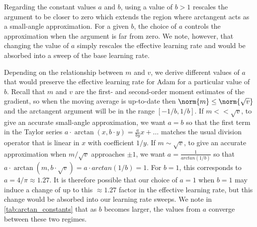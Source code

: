 Regarding the constant values $a$ and $b$, using a value of $b > 1$ rescales the argument to be closer to zero which extends the region where arctangent acts as a small-angle approximation. For a given $b$, the choice of $a$ controls the approximation when the argument is far from zero. We note, however, that changing the value of $a$ simply rescales the effective learning rate and would be absorbed into a sweep of the base learning rate.

Depending on the relationship between $m$ and $v$, we derive different values of $a$ that would preserve the effective learning rate for Adam for a particular value of $b$. Recall that $m$ and $v$ are the first- and second-order moment estimates of the gradient, so when the moving average is up-to-date then $\norm{m} \leq \norm{\sqrt{v}}$ and the arctangent argument will be in the range $[-1/b, 1/b]$. If $m << \sqrt{v}$, to give an accurate small-angle approximation, we want $a=b$ so that the first term in the Taylor series $a \cdot \arctan(x, b\cdot y) = \frac{a}{by} x + \ldots$ matches the usual division operator that is linear in $x$ with coefficient $1/y$. If $m \sim \sqrt{v}$, to give an accurate approximation when $m / \sqrt{v}$ approaches $\pm 1$, we want $a = \frac{1}{arctan(1/b)}$ so that $a \cdot \arctan(m, b \cdot \sqrt{v}) = a \cdot arctan(1/b) = 1$. For $b=1$, this corresponds to $a = 4 / \pi \approx 1.27$. It is therefore possible that our choice of $a=1$ when $b=1$ may induce a change of up to this $\approx 1.27$ factor in the effective learning rate, but this change would be absorbed into our learning rate sweeps. We note in \cref{tab:arctan_constants} that as $b$ becomes larger, the values from $a$ converge between these two regimes.













\newcommand{\figwidth}{0.2\paperwidth}
\newcommand{\figvspace}{\vspace{0.5cm}}
\newcommand{\appsinglefigure}[1]{\texttt{[image: \#1]}}



